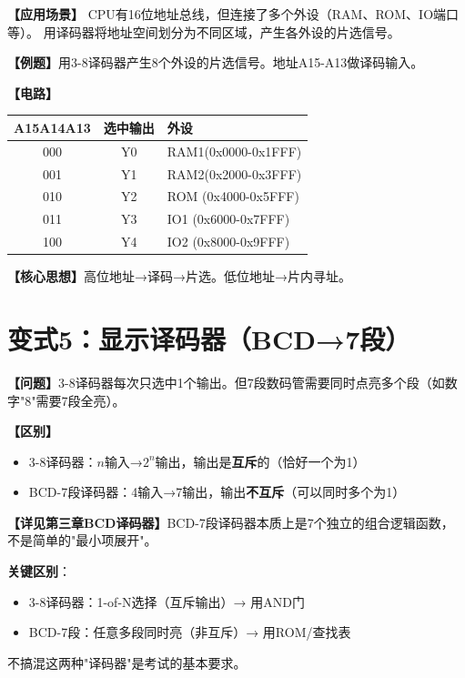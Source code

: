 \begin{detailbox}[完整教学]

\textbf{【应用场景】}
CPU有16位地址总线，但连接了多个外设（RAM、ROM、IO端口等）。
用译码器将地址空间划分为不同区域，产生各外设的片选信号。

\textbf{【例题】}用3-8译码器产生8个外设的片选信号。地址A15-A13做译码输入。

\textbf{【电路】}
\begin{center}
\begin{tabular}{|c|c|l|}
\hline
A15A14A13 & 选中输出 & 外设 \\
\hline
000 & Y0 & RAM1(0x0000-0x1FFF) \\
001 & Y1 & RAM2(0x2000-0x3FFF) \\
010 & Y2 & ROM (0x4000-0x5FFF) \\
011 & Y3 & IO1 (0x6000-0x7FFF) \\
100 & Y4 & IO2 (0x8000-0x9FFF) \\
\hline
\end{tabular}
\end{center}

\textbf{【核心思想】}高位地址→译码→片选。低位地址→片内寻址。

\end{detailbox}


\section{变式5：显示译码器（BCD→7段）}

\begin{detailbox}[完整教学]

\textbf{【问题】}3-8译码器每次只选中1个输出。但7段数码管需要同时点亮多个段（如数字"8"需要7段全亮）。

\textbf{【区别】}
\begin{itemize}
  \item 3-8译码器：$n$输入→$2^n$输出，输出是\textbf{互斥}的（恰好一个为1）
  \item BCD-7段译码器：4输入→7输出，输出\textbf{不互斥}（可以同时多个为1）
\end{itemize}

\textbf{【详见第三章BCD译码器】}BCD-7段译码器本质上是7个独立的组合逻辑函数，不是简单的"最小项展开"。

\begin{examfocus}
\textbf{关键区别}：
\begin{itemize}
  \item 3-8译码器：1-of-N选择（互斥输出）→ 用AND门
  \item BCD-7段：任意多段同时亮（非互斥）→ 用ROM/查找表
\end{itemize}
不搞混这两种"译码器"是考试的基本要求。
\end{examfocus}

\end{detailbox}


